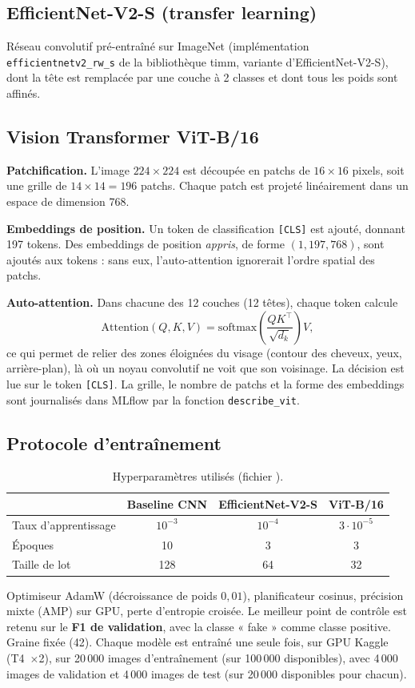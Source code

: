 \documentclass[11pt,a4paper]{article}
\DeclareRobustCommand{\fichier}[1]{\texttt{\StrSubstitute{\detokenize{#1}}{/}{/\allowbreak}}}
\begin{document}
\subsection{EfficientNet-V2-S (transfer learning)}
Réseau convolutif pré-entraîné sur ImageNet (implémentation \texttt{efficientnetv2\_rw\_s} de la bibliothèque timm,
variante d'EfficientNet-V2-S), dont la tête est remplacée par une couche à 2 classes et dont tous les poids sont affinés.

\subsection{Vision Transformer ViT-B/16}
\textbf{Patchification.} L'image $224\times224$ est découpée en patchs de $16\times16$ pixels, soit une grille de
$14\times14=196$ patchs. Chaque patch est projeté linéairement dans un espace de dimension 768.

\textbf{Embeddings de position.} Un token de classification \texttt{[CLS]} est ajouté, donnant 197 tokens. Des
embeddings de position \emph{appris}, de forme $(1,197,768)$, sont ajoutés aux tokens : sans eux, l'auto-attention
ignorerait l'ordre spatial des patchs.

\textbf{Auto-attention.} Dans chacune des 12 couches (12 têtes), chaque token calcule
\[
  \mathrm{Attention}(Q,K,V)=\mathrm{softmax}\!\left(\frac{QK^{\top}}{\sqrt{d_k}}\right)V ,
\]
ce qui permet de relier des zones éloignées du visage (contour des cheveux, yeux, arrière-plan), là où un noyau
convolutif ne voit que son voisinage. La décision est lue sur le token \texttt{[CLS]}. La grille, le nombre de patchs
et la forme des embeddings sont journalisés dans MLflow par la fonction \texttt{describe\_vit}.

\subsection{Protocole d'entraînement}
\begin{table}[H]
\centering\small
\begin{tabular}{@{}lccc@{}}
\toprule
 & \textbf{Baseline CNN} & \textbf{EfficientNet-V2-S} & \textbf{ViT-B/16} \\
\midrule
Taux d'apprentissage & $10^{-3}$ & $10^{-4}$ & $3\cdot10^{-5}$ \\
Époques & 10 & 3 & 3 \\
Taille de lot & 128 & 64 & 32 \\
\bottomrule
\end{tabular}
\caption{Hyperparamètres utilisés (fichier \fichier{params.yaml}).}
\end{table}
Optimiseur AdamW (décroissance de poids $0{,}01$), planificateur cosinus, précision mixte (AMP) sur GPU, perte
d'entropie croisée. Le meilleur point de contrôle est retenu sur le \textbf{F1 de validation}, avec la classe « fake »
comme classe positive. Graine fixée (42). Chaque modèle est entraîné une seule fois, sur GPU Kaggle (T4~$\times$2), sur 20\,000 images d'entraînement (sur 100\,000 disponibles), avec 4\,000 images de validation et 4\,000 images de test (sur 20\,000 disponibles pour chacun).
\end{document}
